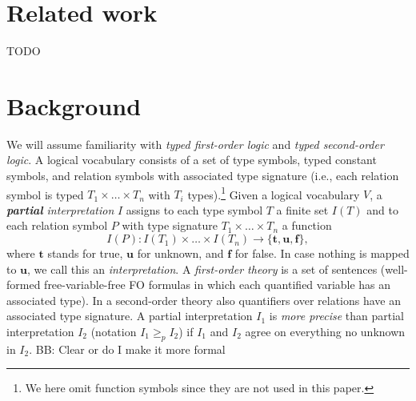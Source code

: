\documentclass{ecai}
\newcommand\m[1]{\ensuremath{#1}\xspace}
\newcommand\ltrue{\m{\mathbf{t}}}
\newcommand\lunkn{\m{\mathbf{u}}}
\newcommand\lfalse{\m{\mathbf{f}}}
\newcommand\geqp{\m{\geq_p}}
\newcommand\bart[1]{{\color{red}\textsc{BB}: #1}}
\begin{document}
\section{Related work}
TODO

\section{Background}
We will assume familiarity with \emph{typed first-order logic} and \emph{typed second-order logic}.  
A logical vocabulary consists of a set of type symbols, typed constant symbols, and relation symbols with associated type signature (i.e., each relation symbol is typed $T_1\times \dots \times T_n$ with $T_i$ types).\footnote{We here omit function symbols since they are not used in this paper.}
Given a logical vocabulary $V$, a \emph{\textbf{partial} interpretation} $I$ assigns to each type symbol $T$ a finite set $I(T)$ and to each 
relation symbol $P$ with type signature $T_1\times \dots \times T_n$ a function 
\[I(P): I(T_1)\times \dots \times I(T_n)\to \{\ltrue,\lunkn,\lfalse\},\] 
where $\ltrue$ stands for true, $\lunkn$ for unknown, and $\lfalse$ for false. In case nothing is mapped to $\lunkn$, we call this an \emph{interpretation}.
A \emph{first-order theory} is a set of sentences (well-formed free-variable-free FO formulas in which each quantified variable has an associated type). 
In a second-order theory also quantifiers over relations have an associated type signature. 
A partial interpretation $I_1$ is \emph{more precise} than partial interpretation $I_2$ (notation $I_1\geqp I_2$) if $I_1$ and $I_2$ agree on everything no unknown in $I_2$.
\bart{Clear or do I make it more formal}
\end{document}
